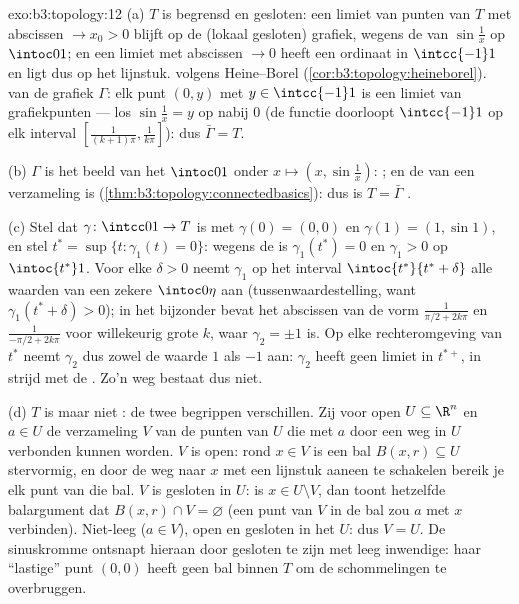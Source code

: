 \begin{solution}{exo:b3:topology:12}
(a) $T$ is begrensd en gesloten: een limiet van punten van $T$ met
abscissen $\to x_0 > 0$ blijft op de (lokaal gesloten) grafiek,
wegens de  van $\sin\frac1x$ op $\intoc01$; en een
limiet met abscissen $\to 0$ heeft een ordinaat in
$\intcc{-1}1$ en ligt dus op het lijnstuk.  volgens
Heine--Borel (\cref{cor:b3:topology:heineborel}).  van
de grafiek $\Gamma$: elk punt $(0, y)$ met $y \in \intcc{-1}1$ is
een limiet van grafiekpunten --- los $\sin\frac1x = y$ op nabij
$0$ (de functie doorloopt $\intcc{-1}1$ op elk interval
$[\frac1{(k+1)\pi}, \frac1{k\pi}]$): dus $\bar\Gamma = T$.

(b) $\Gamma$ is het  beeld van het 
$\intoc01$ onder $x \mapsto (x, \sin\frac1x)$: ; en de
 van een  verzameling is 
(\cref{thm:b3:topology:connectedbasics}): dus is $T = \bar\Gamma$
.

(c) Stel dat $\gamma\colon\intcc01\to T$  is met $\gamma(0)
= (0,0)$ en $\gamma(1) = (1, \sin1)$, en stel $t^* = \sup\{t :
\gamma_1(t) = 0\}$: wegens de  is $\gamma_1(t^*) = 0$
en $\gamma_1 > 0$ op $\intoc{t^*}1$. Voor elke $\delta > 0$ neemt
$\gamma_1$ op het interval $\intoc{t^*}{t^*+\delta}$ alle waarden
van een zekere $\intoc0\eta$ aan (tussenwaardestelling, want
$\gamma_1(t^* + \delta) > 0$); in het bijzonder bevat het
abscissen van de vorm $\frac1{\pi/2 + 2k\pi}$ en $\frac1{-\pi/2 +
2k\pi}$ voor willekeurig grote $k$, waar $\gamma_2 = \pm1$ is. Op
elke rechteromgeving van $t^*$ neemt $\gamma_2$ dus zowel de
waarde $1$ als $-1$ aan: $\gamma_2$ heeft geen limiet in $t^{*+}$,
in strijd met de . Zo'n weg bestaat dus niet.

(d) $T$ is  maar niet : de twee
begrippen verschillen. Zij voor open  $U \subseteq
\R^n$ en $a \in U$ de verzameling $V$ van de punten van $U$ die
met $a$ door een weg in $U$ verbonden kunnen worden. $V$ is open:
rond $x \in V$ is een bal $B(x, r) \subseteq U$ stervormig, en
door de weg naar $x$ met een lijnstuk aaneen te schakelen bereik
je elk punt van die bal. $V$ is gesloten in $U$: is $x \in U
\setminus V$, dan toont hetzelfde balargument dat $B(x, r) \cap V
= \varnothing$ (een punt van $V$ in de bal zou $a$ met $x$
verbinden). Niet-leeg ($a \in V$), open en gesloten in het
 $U$: dus $V = U$. De sinuskromme ontsnapt hieraan
door gesloten te zijn met leeg inwendige: haar ``lastige'' punt
$(0,0)$ heeft geen bal binnen $T$ om de schommelingen te
overbruggen.
\end{solution}

